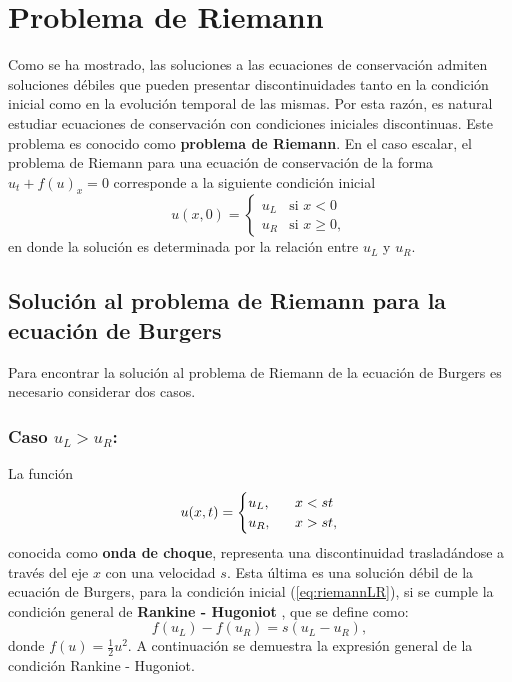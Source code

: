 \section{Problema de Riemann}
Como se ha mostrado, las soluciones a las ecuaciones de conservación admiten soluciones débiles que pueden presentar discontinuidades tanto en la condición inicial como en la evolución temporal de las mismas. Por esta razón, es natural estudiar ecuaciones de conservación con condiciones iniciales discontinuas. Este problema es conocido como \textbf{problema de Riemann}. En el caso escalar, el problema de Riemann para una ecuación de conservación de la forma $u_t + f(u)_x = 0$ corresponde a la siguiente condición inicial
\begin{equation}
	u(x,0) = 
	\begin{cases}
		u_L & \text{si } x < 0 \\
		u_R & \text{si } x \geq 0,
		\label{eq:riemannLR}
	\end{cases}
\end{equation}
en donde la solución es determinada por la relación entre $u_L$ y $u_R$.
\subsection{Solución al problema de Riemann para la ecuación de Burgers}
Para encontrar la solución al problema de Riemann de la ecuación de Burgers es necesario considerar dos casos.
\subsubsection{Caso $u_L > u_R$:}
\label{sec:caso1-burgers}
La función
\begin{equation}
	u(x,t) = 
	\begin{cases}
		u_L, & \hspace{3mm} x < st \\
		u_R, & \hspace{3mm} x > st,		
	\end{cases}\label{eq:solriemannLR}
\end{equation}
conocida como \textbf{onda de choque}, representa una discontinuidad trasladándose a través del eje $x$ con una velocidad $s$. Esta última es una solución débil de la ecuación de Burgers, para la condición inicial (\ref{eq:riemannLR}), si se cumple la condición general de  \textbf{Rankine - Hugoniot} \cite{Cameron}, que se define como:
\begin{equation}
	f(u_L) - f(u_R) = s(u_L - u_R),
	\label{eq:rankinehugo}
\end{equation}
donde $f(u) = \frac{1}{2} u^{2}$. A continuación se demuestra la expresión general de la condición Rankine - Hugoniot.\\

